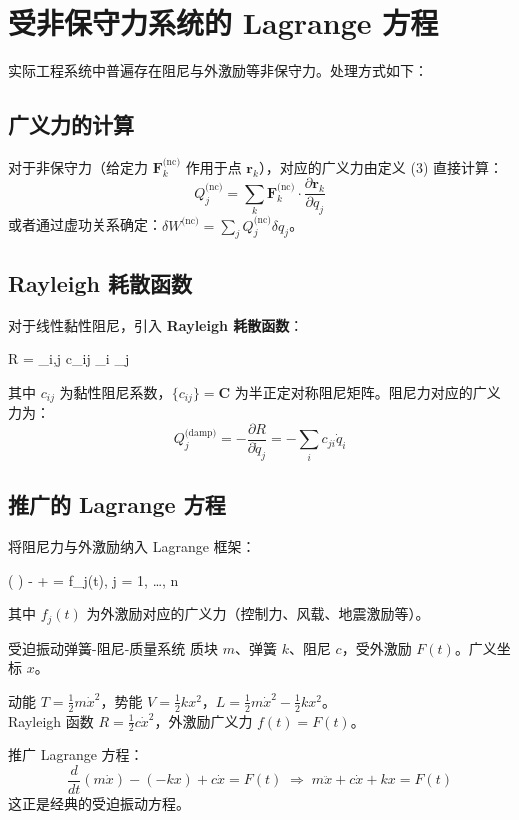 \section{受非保守力系统的 Lagrange 方程}

实际工程系统中普遍存在阻尼与外激励等非保守力。处理方式如下：

\subsection{广义力的计算}

对于非保守力（给定力 $\mathbf{F}_k^{\text{(nc)}}$ 作用于点 $\mathbf{r}_k$），对应的广义力由定义 (3) 直接计算：
\[
Q_j^{\text{(nc)}} = \sum_{k} \mathbf{F}_k^{\text{(nc)}} \cdot \frac{\partial \mathbf{r}_k}{\partial q_j}
\]
或者通过虚功关系确定：$\delta W^{\text{(nc)}} = \sum_j Q_j^{\text{(nc)}} \delta q_j$。

\subsection{Rayleigh 耗散函数}

对于线性黏性阻尼，引入 \textbf{Rayleigh 耗散函数}：
\begin{myformula}
	R =  \sum_{i,j} c_{ij} _i _j
\end{myformula}
其中 $c_{ij}$ 为黏性阻尼系数，$\{c_{ij}\} = \mathbf{C}$ 为半正定对称阻尼矩阵。阻尼力对应的广义力为：
\[
Q_j^{\text{(damp)}} = -\frac{\partial R}{\partial \dot{q}_j} = -\sum_{i} c_{ji} \dot{q}_i
\]

\subsection{推广的 Lagrange 方程}

将阻尼力与外激励纳入 Lagrange 框架：
\begin{myformula}
	 \left(  \right) -  +  = f_j(t), \quad j = 1, \ldots, n
\end{myformula}
其中 $f_j(t)$ 为外激励对应的广义力（控制力、风载、地震激励等）。

\begin{example}{受迫振动弹簧-阻尼-质量系统}
	质块 $m$、弹簧 $k$、阻尼 $c$，受外激励 $F(t)$。广义坐标 $x$。
	
	动能 $T = \frac{1}{2}m\dot{x}^2$，势能 $V = \frac{1}{2}kx^2$，$L = \frac{1}{2}m\dot{x}^2 - \frac{1}{2}kx^2$。\\
	Rayleigh 函数 $R = \frac{1}{2}c\dot{x}^2$，外激励广义力 $f(t) = F(t)$。
	
	推广 Lagrange 方程：
	\[
	\frac{d}{dt} (m\dot{x}) - (-kx) + c\dot{x} = F(t) \;\Longrightarrow\; m\ddot{x} + c\dot{x} + kx = F(t)
	\]
	这正是经典的受迫振动方程。
\end{example}

